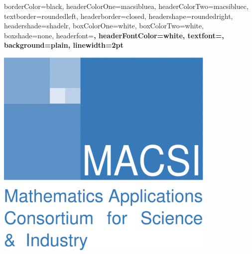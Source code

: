 \documentclass[a0paper,portrait,fontscale=0.3]{baposter}
\begin{document}
\begin{poster}
{%
%
%                               
%
%
%
%
%
%
borderColor=black,
headerColorOne=macsibluea,
headerColorTwo=macsibluec,
textborder=roundedleft,
headerborder=closed,
headershape=roundedright,
headershade=shadelr,
boxColorOne=white,
boxColorTwo=white,
boxshade=none,
headerfont=\Large\bf\textsc, %
headerFontColor=white,
textfont={\setlength{\parindent}{1.5em}},
background=plain,
linewidth=2pt
}
{\begin{minipage}{0.15\textwidth}
	\begin{center}
		\includegraphics[height = 0.05\textheight]{images/macsi_logo.png}

\end{center}
\end{minipage}}
\end{poster}
\end{document}
